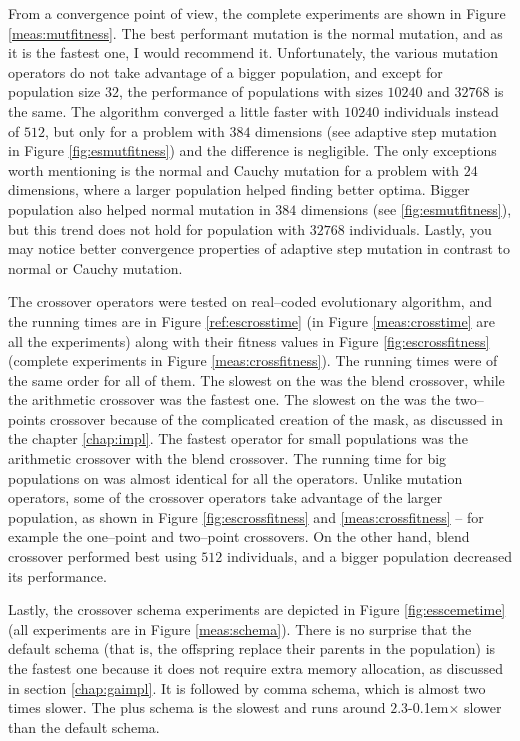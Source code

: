 From a convergence point of view, the complete experiments are shown in Figure \ref{meas:mutfitness}. The best performant mutation is the normal mutation, and as it is the fastest one, I would recommend it. Unfortunately, the various mutation operators do not take advantage of a bigger population, and except for population size $32$, the performance of populations with sizes $10240$ and $32768$ is the same. The algorithm converged a little faster with $10240$ individuals instead of $512$, but only for a problem with $384$ dimensions (see adaptive step mutation in Figure \ref{fig:esmutfitness}) and the difference is negligible. The only exceptions worth mentioning is the normal and Cauchy mutation for a problem with $24$ dimensions, where a larger population helped finding better optima. Bigger population also helped normal mutation in $384$ dimensions (see \ref{fig:esmutfitness}), but this trend does not hold for population with $32768$ individuals. Lastly, you may notice better convergence properties of adaptive step mutation in contrast to normal or Cauchy mutation.

The crossover operators were tested on real--coded evolutionary algorithm, and the running times are in Figure \ref{ref:escrosstime} (in Figure \ref{meas:crosstime} are all the experiments) along with their fitness values in Figure \ref{fig:escrossfitness} (complete experiments in Figure \ref{meas:crossfitness}). The running times were of the same order for all of them. The slowest on the \cpu was the blend crossover, while the arithmetic crossover was the fastest one. The slowest on the \gpu was the two--points crossover because of the complicated creation of the mask, as discussed in the chapter \ref{chap:impl}. The fastest operator for small populations was the arithmetic crossover with the blend crossover. The running time for big populations on \gpu was almost identical for all the operators. Unlike mutation operators, some of the crossover operators take advantage of the larger population, as shown in Figure \ref{fig:escrossfitness} and \ref{meas:crossfitness} -- for example the one--point and two--point crossovers. On the other hand, blend crossover performed best using $512$ individuals, and a bigger population decreased its performance.

Lastly, the crossover schema experiments are depicted in Figure \ref{fig:esscemetime} (all experiments are in Figure \ref{meas:schema}). There is no surprise that the default schema (that is, the offspring replace their parents in the population) is the fastest one because it does not require extra memory allocation, as discussed in section \ref{chap:gaimpl}. It is followed by comma schema, which is almost two times slower. The plus schema is the slowest and runs around $2.3$\kern-0.1em$\times$ slower than the default schema.

